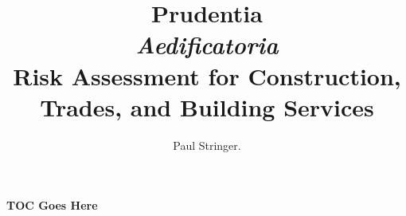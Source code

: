 \documentclass[oneside]{book}
\begin{document}


\title{
  {\Huge\bfseries Prudentia} \\[6pt]
  {\LARGE\itshape Aedificatoria} \\[10pt]
  {\Large Risk Assessment for Construction, Trades, and Building Services}
}
\author{Paul Stringer.}
\date{}
\maketitle

\paragraph{TOC Goes Here}
\newpage











































\end{document}
